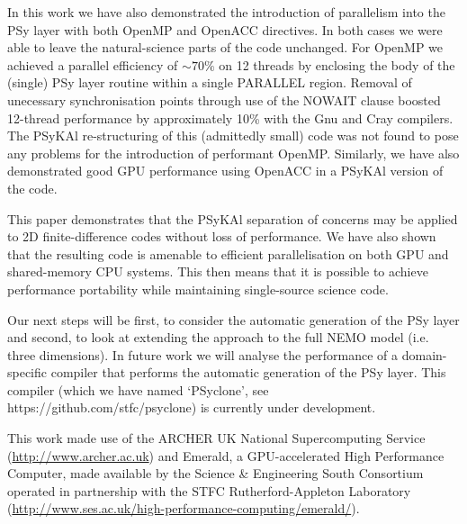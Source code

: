 \documentclass[gmdd, manuscript]{copernicus}
\begin{document}
In this work we have also demonstrated the introduction of parallelism
into the PSy layer with both OpenMP and OpenACC directives. In both
cases we were able to leave the natural-science parts of the code
unchanged. For OpenMP we achieved a parallel efficiency of $\sim70\%$
on 12 threads by enclosing the body of the (single) PSy layer routine
within a single PARALLEL region. Removal of unecessary synchronisation
points through use of the NOWAIT clause boosted 12-thread performance
by approximately 10\% with the Gnu and Cray compilers. The
{PS}y{KA}l re-structuring of this (admittedly small) code was not found
to pose any problems for the introduction of performant OpenMP.
Similarly, we have also demonstrated good GPU performance using OpenACC
in a {PS}y{KA}l version of the code.

This paper demonstrates that the {PS}y{KA}l separation of concerns may
be applied to 2D finite-difference codes without loss of
performance. We have also shown that the resulting code is amenable to
efficient parallelisation on both GPU and shared-memory CPU systems.
This then means that it is possible to achieve performance portability
while maintaining single-source science code.

Our next steps will be first, to consider the automatic generation of the
PSy layer and second, to look at extending the approach to the full NEMO
model (i.e. three dimensions). In future work we will analyse the
performance of a domain-specific compiler that performs the automatic
generation of the PSy layer. This compiler (which we have named
`PSyclone', see https://github.com/stfc/psyclone) is currently under
development.



\begin{acknowledgements}

This work made use of the ARCHER UK National Supercomputing Service
(\url{http://www.archer.ac.uk}) and Emerald, a GPU-accelerated High
Performance Computer, made available by the Science \& Engineering
South Consortium operated in partnership with the STFC
Rutherford-Appleton Laboratory
(\url{http://www.ses.ac.uk/high-performance-computing/emerald/}).

\end{acknowledgements}



\end{document}
